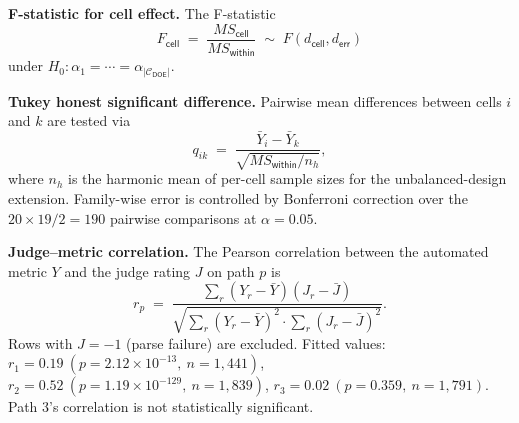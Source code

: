 
\textbf{F-statistic for cell effect.} The F-statistic
\begin{equation}
  F_{\textsf{cell}}
  \;=\;
  \frac{MS_{\textsf{cell}}}{MS_{\textsf{within}}}
  \;\sim\; F(d_{\textsf{cell}}, d_{\textsf{err}})
  \label{eq:fstat}
\end{equation}
under $H_0: \alpha_1 = \cdots = \alpha_{|\mathcal{C}_{\textsf{DOE}}|}$.


\textbf{Tukey honest significant difference.} Pairwise mean differences
between cells $i$ and $k$ are tested via
\begin{equation}
  q_{ik}
  \;=\;
  \frac{\bar{Y}_i - \bar{Y}_k}{\sqrt{MS_{\textsf{within}} / n_h}},
  \label{eq:tukey}
\end{equation}
where $n_h$ is the harmonic mean of per-cell sample sizes for the
unbalanced-design extension. Family-wise error is controlled by
Bonferroni correction over the $20 \times 19 / 2 = 190$ pairwise
comparisons at $\alpha = 0.05$.


\textbf{Judge--metric correlation.} The Pearson correlation between the
automated metric $Y$ and the judge rating $J$ on path $p$ is
\begin{equation}
  r_p \;=\; \frac{\sum_r (Y_r - \bar{Y})(J_r - \bar{J})}{\sqrt{\sum_r (Y_r - \bar{Y})^2 \cdot \sum_r (J_r - \bar{J})^2}}.
  \label{eq:corr}
\end{equation}
Rows with $J = -1$ (parse failure) are excluded. Fitted values:
$r_1 = 0.19\ (p = 2.12 \times 10^{-13},\ n = 1{,}441)$,
$r_2 = 0.52\ (p = 1.19 \times 10^{-129},\ n = 1{,}839)$,
$r_3 = 0.02\ (p = 0.359,\ n = 1{,}791)$.
Path 3's correlation is not statistically significant.


